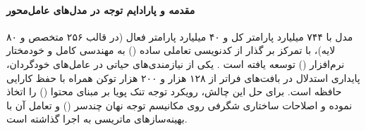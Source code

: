 \item {}

\paragraph*{مقدمه و پارادایم توجه در مدل‌های عامل‌محور}
مدل  با ۷۴۴ میلیارد پارامتر کل و ۴۰ میلیارد پارامتر فعال (در قالب ۲۵۶ متخصص و ۸۰ لایه)، با تمرکز بر گذار از کدنویسی تعاملی ساده () به مهندسی کامل و خودمختار نرم‌افزار () توسعه یافته است \cite{zeng2026glm5}. یکی از نیازمندی‌های حیاتی در عامل‌های خودگردان، پایداری استدلال در بافت‌های فراتر از ۱۲۸ هزار و ۲۰۰ هزار توکن همراه با حفظ کارایی حافظه است. برای حل این چالش،  رویکرد توجه تنک پویا بر مبنای محتوا () را اتخاذ نموده و اصلاحات ساختاری شگرفی روی مکانیسم توجه نهان چندسر () و تعامل آن با بهینه‌سازهای ماتریسی به اجرا گذاشته است.

